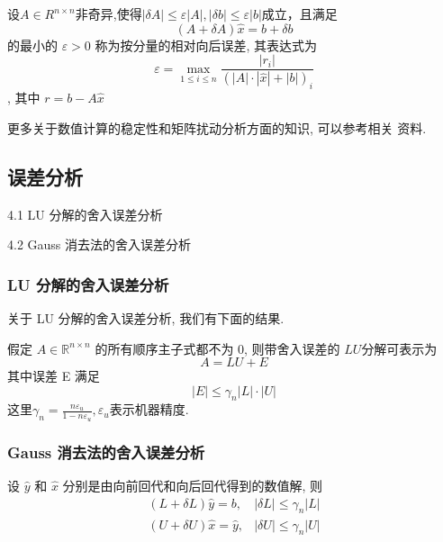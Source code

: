 \documentclass[12pt,a4paper]{article}
\begin{document}
\begin{theorem}
	设$ A∈ R^{n×n}$非奇异,使得$|\delta A| \leq \varepsilon|A|,|\delta b| \leq \varepsilon|b|$成立，且满足
	\begin{equation}
	(A+\delta A) \hat{x}=b+\delta b
	\end{equation}
	的最小的 $ε > 0$ 称为按分量的相对向后误差, 其表达式为
	\begin{equation}
	\varepsilon=\max _{1 \leq i \leq n} \frac{\left|r_{i}\right|}{(|A| \cdot|\hat{x}|+|b|)_{i}}
	\end{equation},
	其中 $r = b − A\hat{x}$
\end{theorem}


更多关于数值计算的稳定性和矩阵扰动分析方面的知识, 可以参考相关
资料.

\subsection{误差分析}

4.1 LU 分解的舍入误差分析

4.2 Gauss 消去法的舍入误差分析

\subsubsection{LU 分解的舍入误差分析}
关于 LU 分解的舍入误差分析, 我们有下面的结果.

\begin{theorem}
	假定 $A ∈ \mathbb{R}^{n×n}$ 的所有顺序主子式都不为 $0$, 则带舍入误差的 $LU$分解可表示为
	\begin{equation}
	A=L U+E
	\end{equation}
	其中误差 E 满足
	\begin{equation}
	|E| \leq \gamma_{n}|L| \cdot|U|
	\end{equation}
	这里$\gamma_{n}=\frac{n \varepsilon_{u}}{1-n \varepsilon_{u}}, \varepsilon_{u}$表示机器精度.
\end{theorem}


\subsubsection{Gauss 消去法的舍入误差分析}

\begin{lemma}[High02] 设 $\hat{y}$ 和 $\hat{x}$ 分别是由向前回代和向后回代得到的数值解, 则
	\begin{equation}
	\begin{array}{ll}{(L+\delta L) \hat{y}=b,} & {|\delta L| \leq \gamma_{n}|L|} \\ {(U+\delta U) \hat{x}=\hat{y},} & {|\delta U| \leq \gamma_{n}|U|}\end{array}
	\end{equation}
\end{lemma}
\end{document}

